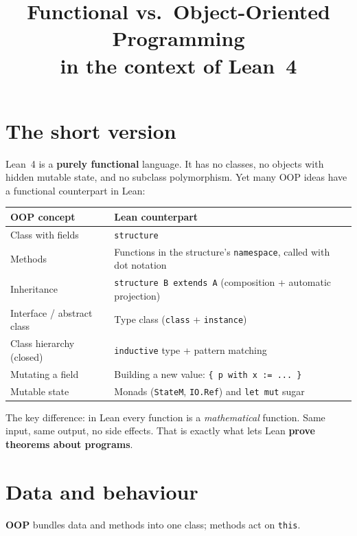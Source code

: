 \documentclass[11pt,a4paper]{article}
\title{Functional vs.\ Object-Oriented Programming\\[2pt]
  \large in the context of Lean~4}
\author{}
\date{}
\newcommand{\lean}[1]{\lstinline[language=Lean]{#1}}
\begin{document}
\maketitle
\vspace{-2.5em}

\section*{The short version}

Lean~4 is a \textbf{purely functional} language. It has no classes, no
objects with hidden mutable state, and no subclass polymorphism. Yet many
OOP ideas have a functional counterpart in Lean:

\begin{center}
\begin{tabularx}{\linewidth}{@{}lX@{}}
\toprule
\textbf{OOP concept} & \textbf{Lean counterpart} \\
\midrule
Class with fields        & \lean{structure} \\
Methods                  & Functions in the structure's \lean{namespace}, called with dot notation \\
Inheritance              & \lean{structure B extends A} (composition + automatic projection) \\
Interface / abstract class & Type class (\lean{class} + \lean{instance}) \\
Class hierarchy (closed) & \lean{inductive} type + pattern matching \\
Mutating a field         & Building a new value: \texttt{\{ p with x := ... \}} \\
Mutable state            & Monads (\lean{StateM}, \lean{IO.Ref}) and \lean{let mut} sugar \\
\bottomrule
\end{tabularx}
\end{center}

The key difference: in Lean every function is a \emph{mathematical}
function. Same input, same output, no side effects. That is exactly what
lets Lean \textbf{prove theorems about programs}.

\section{Data and behaviour}

\textbf{OOP} bundles data and methods into one class; methods act on
\texttt{this}.
\end{document}
